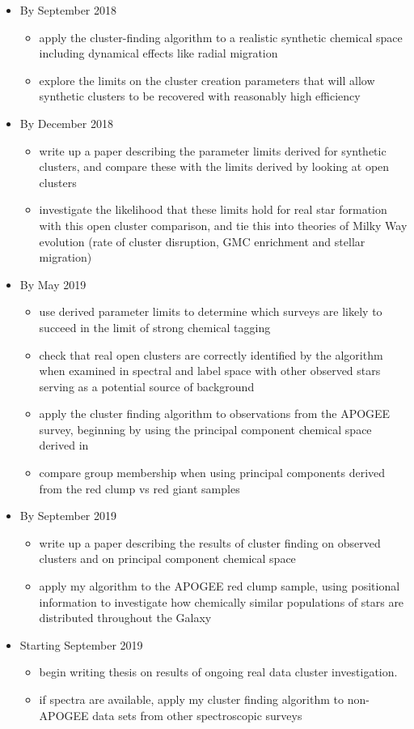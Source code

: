 \documentclass[11pt]{article}
\begin{document}
\begin{itemize}
\item By September 2018
\begin{itemize}
\item {\color{RoyalBlue}apply the cluster-finding algorithm to a realistic synthetic chemical space} {\color{Mulberry} including dynamical effects like radial migration}
\item {\color{ForestGreen} explore the limits on the cluster creation parameters that will allow synthetic clusters to be recovered with reasonably high efficiency}
\end{itemize}
\item By December 2018
\begin{itemize}
\item write up a paper describing the parameter limits derived for synthetic clusters, and compare these with the limits derived by looking at open clusters
\item investigate the likelihood that these limits hold for real star formation with this open cluster comparison, and tie this into theories of Milky Way evolution (rate of cluster disruption, GMC enrichment and stellar migration)
\end{itemize}
\item By May 2019
\begin{itemize}
\item use derived parameter limits to determine which surveys are likely to succeed in the limit of strong chemical tagging
\item check that real open clusters are correctly identified by the algorithm when examined in spectral and label space with other observed stars serving as a potential source of background
\item apply the cluster finding algorithm to observations from the APOGEE survey, beginning by using the principal component chemical space derived in \citet{Price-Jones2017}
\item compare group membership when using principal components derived from the red clump vs red giant samples
\end{itemize} 
\item By September 2019
\begin{itemize}
\item write up a paper describing the results of cluster finding on observed clusters and on principal component chemical space
\item apply my algorithm to the APOGEE red clump sample, using positional information to investigate how chemically similar populations of stars are distributed throughout the Galaxy
\end{itemize}
\item Starting September 2019
\begin{itemize}
\item begin writing thesis on results of ongoing real data cluster investigation.
\item if spectra are available, apply my cluster finding algorithm to non-APOGEE data sets from other spectroscopic surveys
\end{itemize}
\end{itemize}


\end{document}
